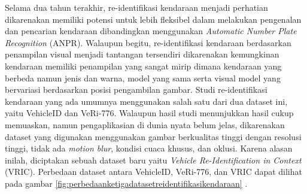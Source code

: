 Selama dua tahun terakhir, re-identifikasi kendaraan menjadi perhatian dikarenakan \linebreak memiliki potensi untuk lebih fleksibel dalam melakukan pengenalan dan pencarian kendaraan dibandingkan 
menggunakan \emph{Automatic Number Plate Recognition} (ANPR). Walaupun begitu, re-identifikasi kendaraan berdasarkan penampilan visual menjadi tantangan tersendiri dikarenakan kemungkinan 
kendaraan memiliki penampilan yang sangat mirip dimana kendaraan yang berbeda namun jenis dan warna, model yang sama serta visual model yang bervariasi \linebreak berdasarkan posisi pengambilan 
gambar. Studi re-identifikasi kendaraan yang ada umumnya menggunakan salah satu dari dua dataset ini, yaitu VehicleID dan VeRi-776. Walaupun hasil studi menunjukkan hasil cukup memuaskan, 
namun pengaplikasian di dunia nyata belum jelas, dikarenakan dataset yang digunakan menggunakan gambar berkualitas tinggi dengan resolusi tinggi, tidak ada \emph{motion blur}, kondisi cuaca 
khusus, dan oklusi. Karena alasan inilah, diciptakan sebuah dataset baru yaitu \emph{Vehicle Re-Identification in Context} (VRIC). Perbedaan dataset antara VehicleID, VeRi-776, dan VRIC 
dapat dilihat pada gambar \ref{fig:perbedaanketigadatasetreidentifikasikendaraan} \parencite{Kanaci2018}.

